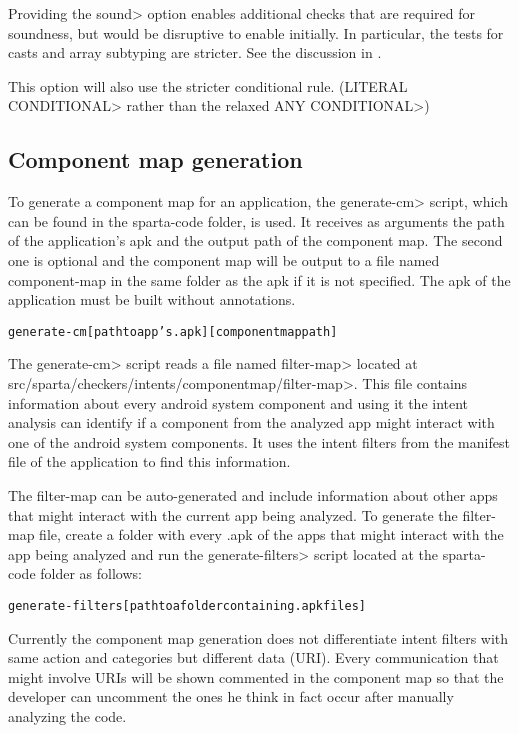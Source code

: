 \noindent
Providing the \<sound> option enables additional checks that are
required for soundness, but would be disruptive to enable initially.
In particular, the tests for casts and array subtyping are stricter.
See the discussion in .

This option will also use the stricter conditional rule. (\<LITERAL
\flowsto{} CONDITIONAL> rather than the relaxed \<ANY \flowsto{} CONDITIONAL>)


\subsection{Component map generation\label{component-map-generation}}
To generate a component map for an application, the \<generate-cm> script, which 
can be found in the sparta-code folder, is used.
It receives as arguments the path of the application's apk and the output
path of the component map. The second one is optional and the component map
will be output to a file named component-map in the same folder as the apk if 
it is not specified. The apk of the application must be built without
annotations.
\begin{alltt}
generate-cm [path to app's .apk] [component map path]
\end{alltt}

The \<generate-cm> script reads a file named \<filter-map> 
located at \<src/sparta/checkers/intents/componentmap/filter-map>. 
This file contains
information about every android system component and using it the intent
analysis can identify if a component from the analyzed app might interact
with one of the android system components. It uses the intent filters
from the manifest file of the application to find this information.

The filter-map can be auto-generated and include information about other
apps that might interact with the current app being analyzed. To generate
the filter-map file, create a folder with  every .apk of the apps
that might interact with the app being analyzed and run the \<generate-filters>
 script located at the sparta-code folder as follows:
 
\begin{alltt}
generate-filters [path to a folder containing .apk files]
\end{alltt}

Currently the component map generation does not differentiate intent filters
with same action and categories but different data (URI). Every communication
that might involve URIs will be shown commented in the component map so that
the developer can uncomment the ones he think in fact occur after manually
analyzing the code.


